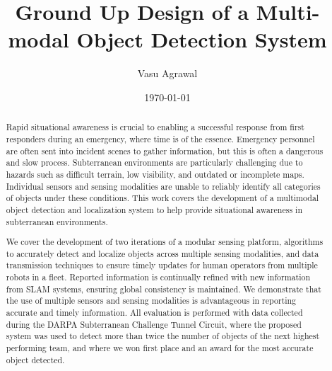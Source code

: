 \documentclass[12pt]{cmuthesis}
\begin{document}
 
\frontmatter

\pagestyle{empty}

\title{ %
{\bf Ground Up Design of a Multi-modal Object Detection System}}
\author{Vasu Agrawal}
\date{\today}


\support{}
\disclaimer{}



\maketitle

\pagestyle{plain} %


\begin{abstract}
Rapid situational awareness is crucial to enabling a successful response from first responders during an emergency, where time is of the essence. Emergency personnel are often sent into incident scenes to gather information, but this is often a dangerous and slow process. Subterranean environments are particularly challenging due to hazards such as difficult terrain, low visibility, and outdated or incomplete maps. Individual sensors and sensing modalities are unable to reliably identify all categories of objects under these conditions. This work covers the development of a multimodal object detection and localization system to help provide situational awareness in subterranean environments.

We cover the development of two iterations of a modular sensing platform, algorithms to accurately detect and localize objects across multiple sensing modalities, and data transmission techniques to ensure timely updates for human operators from multiple robots in a fleet. Reported information is continually refined with new information from SLAM systems, ensuring global consistency is maintained. We demonstrate that the use of multiple sensors and sensing modalities is advantageous in reporting accurate and timely information. All evaluation is performed with data collected during the DARPA Subterranean Challenge Tunnel Circuit, where the proposed system was used to detect more than twice the number of objects of the next highest performing team, and where we won first place and an award for the most accurate object detected.
\end{abstract}
\end{document}
